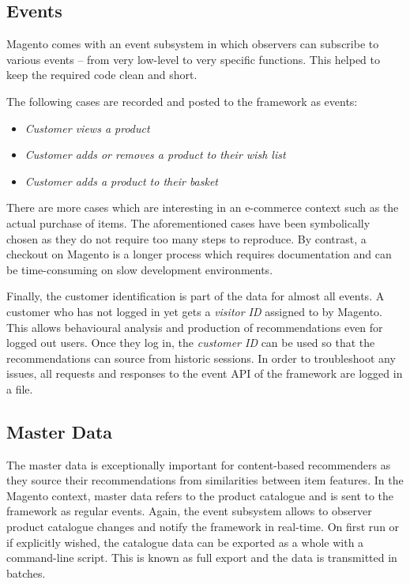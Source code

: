 \subsection{Events}
\label{implementation-magento-events}

Magento comes with an event subsystem in which observers can subscribe to various events -- from very low-level to very specific functions. This helped to keep the required code clean and short.

The following cases are recorded and posted to the framework as events:

\begin{itemize}
\item \emph{Customer views a product}
\item \emph{Customer adds or removes a product to their wish list}
\item \emph{Customer adds a product to their basket}
\end{itemize}

There are more cases which are interesting in an e-commerce context such as the actual purchase of items. The aforementioned cases have been symbolically chosen as they do not require too many steps to reproduce. By contrast, a checkout on Magento is a longer process which requires documentation and can be time-consuming on slow development environments.

Finally, the customer identification is part of the data for almost all events. A customer who has not logged in yet gets a \emph{visitor ID} assigned to by Magento. This allows behavioural analysis and production of recommendations even for logged out users. Once they log in, the \emph{customer ID} can be used so that the recommendations can source from historic sessions. In order to troubleshoot any issues, all requests and responses to the event API of the framework are logged in a file.

\subsection{Master Data}
\label{implementation-magento-masterdata}

The master data is exceptionally important for content-based recommenders as they source their recommendations from similarities between item features. In the Magento context, master data refers to the product catalogue and is sent to the framework as regular events. Again, the event subsystem allows to observer product catalogue changes and notify the framework in real-time. On first run or if explicitly wished, the catalogue data can be exported as a whole with a command-line script. This is known as full export and the data is transmitted in batches.

